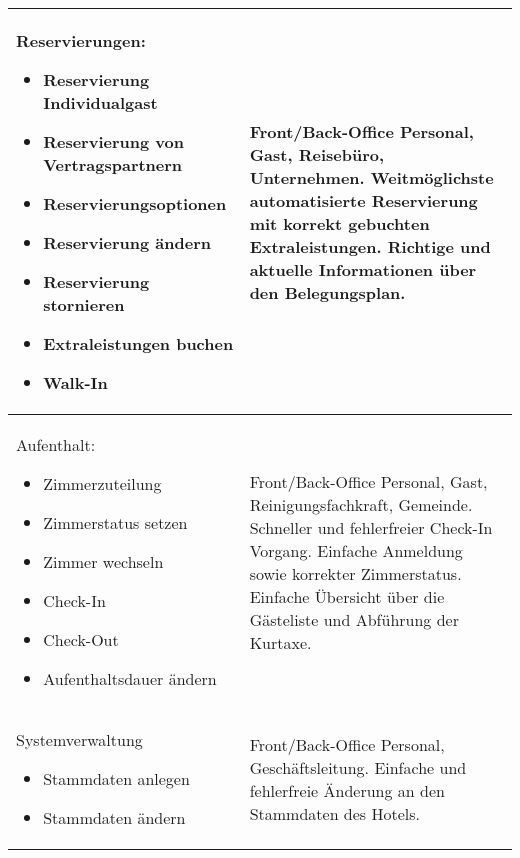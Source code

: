 \documentclass[../../Pflichtenheft.tex]{subfiles}
\begin{document}
\begin{longtable}{|p{7cm}|p{7cm}|}
        \\ \hline
        Reservierungen:
        \begin{itemize}
            \item Reservierung Individualgast
            \item Reservierung von Vertragspartnern
            \item Reservierungsoptionen
            \item Reservierung ändern
            \item Reservierung stornieren
            \item Extraleistungen buchen
            \item Walk-In
        \end{itemize}
        & Front/Back-Office Personal, Gast, Reisebüro, Unternehmen. Weitmöglichste
		automatisierte Reservierung mit korrekt gebuchten Extraleistungen.
		Richtige und aktuelle Informationen über den Belegungsplan.
        \\ \hline
        Aufenthalt:
        \begin{itemize}
            \item Zimmerzuteilung
            \item Zimmerstatus setzen
            \item Zimmer wechseln
            \item Check-In
            \item Check-Out
            \item Aufenthaltsdauer ändern
        \end{itemize}
        & Front/Back-Office Personal, Gast, Reinigungsfachkraft, Gemeinde.
		Schneller und fehlerfreier Check-In Vorgang. Einfache Anmeldung sowie 
		korrekter Zimmerstatus. Einfache Übersicht über die Gästeliste und
		Abführung der Kurtaxe.
        \\ \hline
        Systemverwaltung
        \begin{itemize}
            \item Stammdaten anlegen
            \item Stammdaten ändern
        \end{itemize}
        & Front/Back-Office Personal, Geschäftsleitung. Einfache und fehlerfreie
		Änderung an den Stammdaten des Hotels.
        \hline
    \end{longtable}
\end{document}
